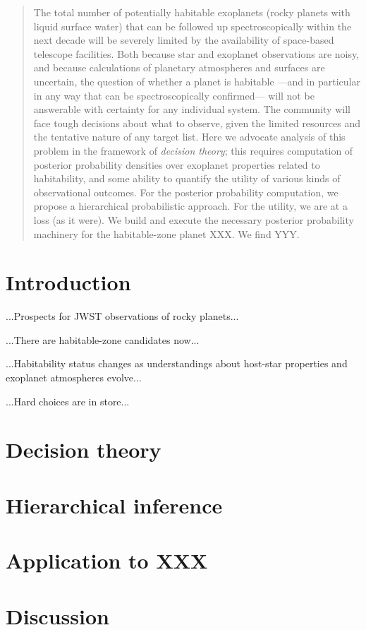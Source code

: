 \documentclass[12pt,letterpaper]{article}
\begin{document}
\begin{abstract}
The total number of potentially habitable exoplanets
  (rocky planets with liquid surface water)
  that can be followed up spectroscopically within the next decade
  will be severely limited
  by the availability of space-based telescope facilities.
Both because star and exoplanet observations are noisy,
  and because calculations of planetary atmospheres and surfaces are uncertain,
  the question of whether a planet is habitable%
  ---and in particular in any way that can be spectroscopically confirmed---%
  will not be answerable with certainty for any individual system.
The community will face tough decisions about what to observe,
  given the limited resources and the tentative nature of any target list.
Here we advocate analysis of this problem in the framework of \emph{decision theory};
  this requires computation of posterior probability densities
  over exoplanet properties related to habitability,
  and some ability to quantify the utility of various kinds of observational outcomes.
For the posterior probability computation,
  we propose a hierarchical probabilistic approach.
For the utility, we are at a loss (as it were).
We build and execute the necessary posterior probability machinery for the
  habitable-zone planet XXX.
We find YYY.
\end{abstract}

\section{Introduction}

...Prospects for JWST observations of rocky planets...

...There are habitable-zone candidates now...

...Habitability status changes as understandings about host-star properties and exoplanet atmospheres evolve...

...Hard choices are in store...

\section{Decision theory}

\section{Hierarchical inference}

\section{Application to XXX}

\section{Discussion}
\end{document}
